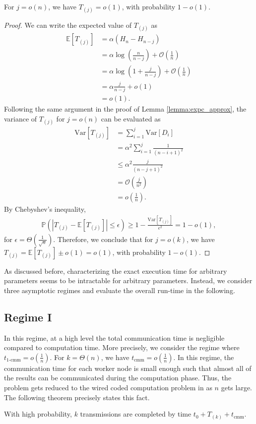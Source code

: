 \documentclass[onecolumn,journal,twoside]{IEEEtran}
\newcommand{\Prob}{\mathbb{P}}
\newcommand{\var}{\text{Var}}
\newcommand{\Expc}{\mathbb{E}}
\begin{document}
\begin{lemma}\label{lemma:expc_approx2}
For $j=o(n)$, we have $T_{(j)} = o(1)$, with probability $1-o(1)$.
\end{lemma}
\begin{proof}
We can write the expected value of $T_{(j)}$ as 
\begin{align}
\Expc[T_{(j)}]&= \alpha (H_n - H_{n-j}) \nonumber\\
&= \alpha \log (\frac{n}{n-j}) + \mathcal{O}(\frac{1}{n})\nonumber\\
&=\alpha \log (1+\frac{j}{n-j}) + \mathcal{O}(\frac{1}{n})\nonumber\\
&= \alpha \frac{j}{n-j} + o(1)\nonumber\\
&= o(1).
\end{align}
Following the same argument in the proof of Lemma \ref{lemma:expc_approx}, the variance of $T_{(j)}$ for $j=o(n)$ can be evaluated as 
\begin{align}
\var[T_{(j)}]&= \sum_{i=1}^{j} \var[D_i]\nonumber\\
&= \alpha^2 \sum_{i=1}^{j} \frac{1}{(n-i+1)^2}\nonumber\\
&\leq \alpha^2  \frac{j}{(n-j+1)^2}\nonumber\\
&=  \mathcal{O}(\frac{j}{n^2})\nonumber\\
&= o(\frac{1}{n}).
\end{align}
By Chebyshev's inequality, 
\begin{align}
\Prob(| T_{(j)} - \mathbb{E}[T_{(j)}] |\leq \epsilon ) \geq 1-\frac{\var[T_{(j)}]}{\epsilon^2}=1-o(1),
\end{align}
for $\epsilon=\Theta(\frac{1}{\sqrt{n}})$. Therefore, we conclude that for $j=o(k)$, we have $T_{(j)}=\mathbb{E}[T_{(j)}] \pm o(1)=o(1)$, with probability $1-o(1)$.
\end{proof}



As discussed before, characterizing the exact execution time for arbitrary parameters seems to be intractable for arbitrary parameters. Instead, we consider three asymptotic regimes and evaluate the overall run-time in the following.
\subsection{Regime I}
In this regime, at a high level the total communication time is negligible compared to computation time. More precisely, we consider the regime where $t_{\text{1-cmm}}=o(\frac{1}{n})$. For $k=\Theta(n)$, we have  $t_{\text{cmm}}=o(\frac{1}{n})$. In this regime, the communication time for each worker node is small enough such that almost all of the results can be communicated during the computation phase. Thus, the problem gets reduced to the wired coded computation problem in \cite{lee2016speeding} as $n$ gets large. The following theorem precisely states this fact.
\begin{theorem}
With high probability, $k$ transmissions are completed by time \normalfont $t_0+T_{(k)}+t_{\text{cmm}}$.
\end{theorem}
\end{document}
